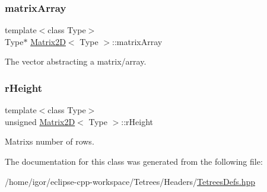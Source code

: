 \subsubsection{\texorpdfstring{matrix\+Array}{matrixArray}}
{\footnotesize\ttfamily template$<$class Type$>$ \\
Type$\ast$ \hyperlink{classMatrix2D}{Matrix2D}$<$ Type $>$\+::matrix\+Array\hspace{0.3cm}{\ttfamily [private]}}

The vector abstracting a matrix/array. \mbox{\label{classMatrix2D_afdcd47964719a1c4e006fbdd313d2f17}} 
\subsubsection{\texorpdfstring{r\+Height}{rHeight}}
{\footnotesize\ttfamily template$<$class Type$>$ \\
unsigned \hyperlink{classMatrix2D}{Matrix2D}$<$ Type $>$\+::r\+Height\hspace{0.3cm}{\ttfamily [private]}}

Matrix\textquotesingle{}s number of rows. 

The documentation for this class was generated from the following file\+:\begin{DoxyCompactItemize}
\item 
/home/igor/eclipse-\/cpp-\/workspace/\+Tetrees/\+Headers/\hyperlink{TetreesDefs_8hpp}{Tetrees\+Defs.\+hpp}\end{DoxyCompactItemize}
